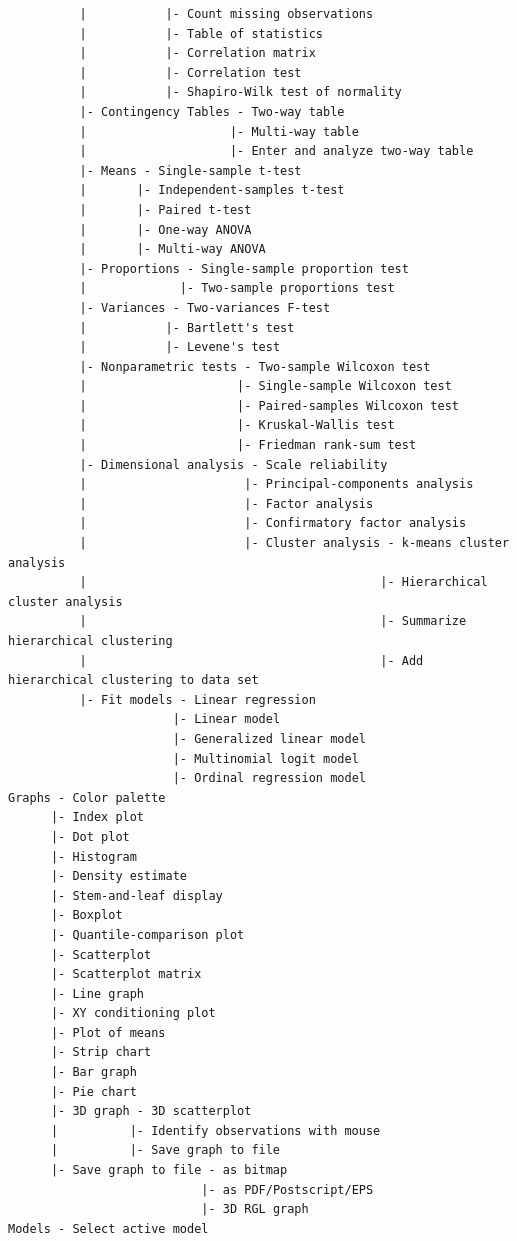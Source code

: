 \documentclass{article}%
\begin{document}
\begin{verbatim}
          |           |- Count missing observations
          |           |- Table of statistics
          |           |- Correlation matrix
          |           |- Correlation test
          |           |- Shapiro-Wilk test of normality
          |- Contingency Tables - Two-way table
          |                    |- Multi-way table
          |                    |- Enter and analyze two-way table
          |- Means - Single-sample t-test
          |       |- Independent-samples t-test
          |       |- Paired t-test
          |       |- One-way ANOVA
          |       |- Multi-way ANOVA
          |- Proportions - Single-sample proportion test
          |             |- Two-sample proportions test
          |- Variances - Two-variances F-test
          |           |- Bartlett's test
          |           |- Levene's test
          |- Nonparametric tests - Two-sample Wilcoxon test
          |                     |- Single-sample Wilcoxon test
          |                     |- Paired-samples Wilcoxon test
          |                     |- Kruskal-Wallis test
          |                     |- Friedman rank-sum test
          |- Dimensional analysis - Scale reliability
          |                      |- Principal-components analysis
          |                      |- Factor analysis
          |                      |- Confirmatory factor analysis
          |                      |- Cluster analysis - k-means cluster analysis
          |                                         |- Hierarchical cluster analysis
          |                                         |- Summarize hierarchical clustering
          |                                         |- Add hierarchical clustering to data set
          |- Fit models - Linear regression
                       |- Linear model
                       |- Generalized linear model
                       |- Multinomial logit model
                       |- Ordinal regression model
Graphs - Color palette
      |- Index plot
      |- Dot plot
      |- Histogram
      |- Density estimate
      |- Stem-and-leaf display
      |- Boxplot
      |- Quantile-comparison plot
      |- Scatterplot
      |- Scatterplot matrix
      |- Line graph
      |- XY conditioning plot
      |- Plot of means
      |- Strip chart
      |- Bar graph
      |- Pie chart
      |- 3D graph - 3D scatterplot
      |          |- Identify observations with mouse
      |          |- Save graph to file
      |- Save graph to file - as bitmap
                           |- as PDF/Postscript/EPS
                           |- 3D RGL graph
Models - Select active model

\end{verbatim}
\end{document}
